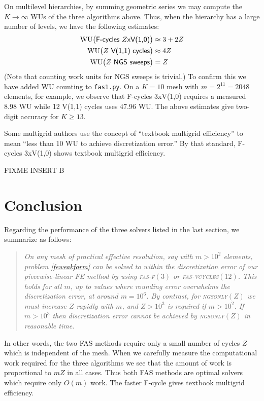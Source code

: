 \documentclass[letterpaper,final,12pt,reqno]{amsart}
\begin{document}
On multilevel hierarchies, by summing geometric series \cite{Briggsetal2000} we may compute the $K\to\infty$ WUs of the three algorithms above.  Thus, when the hierarchy has a large number of levels, we have the following estimates:
\begin{align*}
\text{WU}\big(\text{\textsf{F-cycles $Z$xV(1,0)}}\big) &\approx 3+2Z \\
\text{WU}\big(\text{\textsf{$Z$ V(1,1) cycles}}\big)   &\approx 4Z \\
\text{WU}\big(\text{\textsf{$Z$ NGS sweeps}}\big)      &= Z
\end{align*}
(Note that counting work units for NGS sweeps is trivial.)  To confirm this we have added WU counting to \texttt{fas1.py}.  On a $K=10$ mesh with $m=2^{11}=2048$ elements, for example, we observe that \textsf{F-cycles 3xV(1,0)} requires a measured 8.98 WU while \textsf{12 V(1,1) cycles} uses 47.96 WU.  The above estimates give two-digit accuracy for $K \ge 13$.

Some multigrid authors \cite[for example]{BrownSmithAhmadia2013} use the concept of ``textbook multigrid efficiency'' to mean ``less than 10 WU to achieve discretization error.''  By that standard, \textsf{F-cycles 3xV(1,0)} shows textbook multigrid efficiency.

FIXME INSERT B


\section{Conclusion}  \label{sec:conclusion}

Regarding the performance of the three solvers listed in the last section, we summarize as follows:

\begin{quotation}
\emph{On any mesh of practical effective resolution, say with $m>10^2$ elements, problem \eqref{feweakform} can be solved to within the discretization error of our piecewise-linear FE method by using \textsc{fas-f}$(3)$ or \textsc{fas-vcycles}$(12)$.  This holds for all $m$, up to values where rounding error overwhelms the discretization error, at around $m=10^6$.  By contrast, for \textsc{ngsonly}$(Z)$ we must increase $Z$ rapidly with $m$, and $Z > 10^3$ is required if $m>10^2$.  If $m>10^3$ then discretization error cannot be achieved by \textsc{ngsonly}$(Z)$ in reasonable time.}
\end{quotation}

In other words, the two FAS methods require only a small number of cycles $Z$ which is independent of the mesh.  When we carefully measure the computational work required for the three algorithms we see that the amount of work is proportional to $mZ$ in all cases.  Thus both FAS methods are optimal solvers which require only $O(m)$ work.  The faster F-cycle gives textbook multigrid efficiency.


\small

\bigskip


\end{document}
